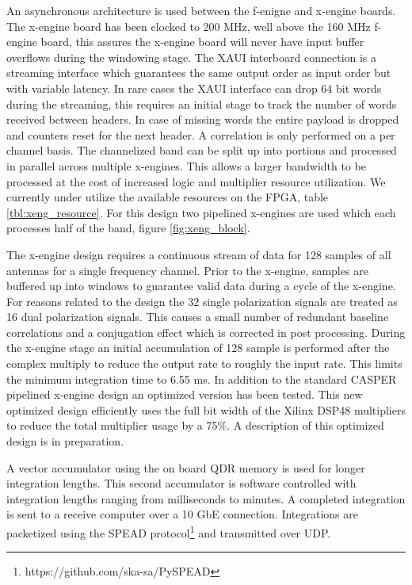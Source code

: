 \documentclass[useAMS,macros,usenatbib,onecolumn]{mn2e}
\begin{document}
An asynchronous architecture is used between the f-enigne and x-engine boards.
The x-engine board has been clocked to 200 MHz, well above the 160 MHz f-engine board, this assures the x-engine board will never have input buffer overflows during the windowing stage.
The XAUI interboard connection is a streaming interface which guarantees the same output order as input order but with variable latency.
In rare cases the XAUI interface can drop 64 bit words during the streaming, this requires an initial stage to track the number of words received between headers.
In case of missing words the entire payload is dropped and counters reset for the next header.
A correlation is only performed on a per channel basis.
The channelized band can be split up into portions and processed in parallel across multiple x-engines.
This allows a larger bandwidth to be processed at the cost of increased logic and multiplier resource utilization.
We currently under utilize the available resources on the FPGA, table \ref{tbl:xeng_resource}.
For this design two pipelined x-engines are used which each processes half of the band, figure \ref{fig:xeng_block}.

The x-engine design requires a continuous stream of data for 128 samples of all antennas for a single frequency channel.
Prior to the x-engine, samples are buffered up into windows to guarantee valid data during a cycle of the x-engine.
For reasons related to the design the 32 single polarization signals are treated as 16 dual polarization signals.
This causes a small number of redundant baseline correlations and a conjugation effect which is corrected in post processing.
During the x-engine stage an initial accumulation of 128 sample is performed after the complex multiply to reduce the output rate to roughly the input rate.
This limits the minimum integration time to 6.55 ms.
In addition to the standard CASPER pipelined x-engine design an optimized version has been tested.
This new optimized design efficiently uses the full bit width of the Xilinx DSP48 multipliers to reduce the total multiplier usage by a 75\%.
A description of this optimized design is in preparation.

A vector accumulator using the on board QDR memory is used for longer integration lengths.
This second accumulator is software controlled with integration lengths ranging from milliseconds to minutes.
A completed integration is sent to a receive computer over a 10 GbE connection.
Integrations are packetized using the SPEAD protocol\footnote{https://github.com/ska-sa/PySPEAD} and transmitted over UDP.
\end{document}
